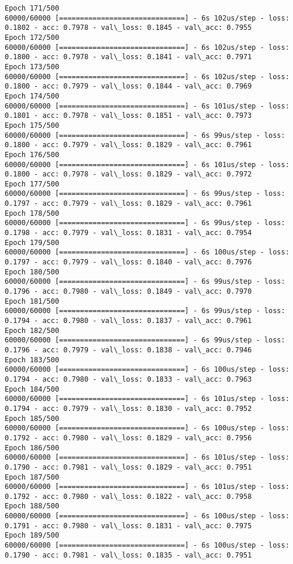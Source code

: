 \documentclass[11pt]{article}
\begin{document}
\begin{Verbatim}[commandchars=\\\{\}]
Epoch 171/500
60000/60000 [==============================] - 6s 102us/step - loss: 0.1802 - acc: 0.7978 - val\_loss: 0.1845 - val\_acc: 0.7955
Epoch 172/500
60000/60000 [==============================] - 6s 102us/step - loss: 0.1800 - acc: 0.7978 - val\_loss: 0.1841 - val\_acc: 0.7971
Epoch 173/500
60000/60000 [==============================] - 6s 102us/step - loss: 0.1800 - acc: 0.7979 - val\_loss: 0.1844 - val\_acc: 0.7969
Epoch 174/500
60000/60000 [==============================] - 6s 101us/step - loss: 0.1801 - acc: 0.7978 - val\_loss: 0.1851 - val\_acc: 0.7973
Epoch 175/500
60000/60000 [==============================] - 6s 99us/step - loss: 0.1800 - acc: 0.7979 - val\_loss: 0.1829 - val\_acc: 0.7961
Epoch 176/500
60000/60000 [==============================] - 6s 101us/step - loss: 0.1800 - acc: 0.7978 - val\_loss: 0.1829 - val\_acc: 0.7972
Epoch 177/500
60000/60000 [==============================] - 6s 99us/step - loss: 0.1797 - acc: 0.7979 - val\_loss: 0.1829 - val\_acc: 0.7961
Epoch 178/500
60000/60000 [==============================] - 6s 99us/step - loss: 0.1798 - acc: 0.7979 - val\_loss: 0.1831 - val\_acc: 0.7954
Epoch 179/500
60000/60000 [==============================] - 6s 100us/step - loss: 0.1797 - acc: 0.7979 - val\_loss: 0.1840 - val\_acc: 0.7976
Epoch 180/500
60000/60000 [==============================] - 6s 99us/step - loss: 0.1796 - acc: 0.7980 - val\_loss: 0.1849 - val\_acc: 0.7970
Epoch 181/500
60000/60000 [==============================] - 6s 99us/step - loss: 0.1794 - acc: 0.7980 - val\_loss: 0.1837 - val\_acc: 0.7961
Epoch 182/500
60000/60000 [==============================] - 6s 99us/step - loss: 0.1796 - acc: 0.7979 - val\_loss: 0.1838 - val\_acc: 0.7946
Epoch 183/500
60000/60000 [==============================] - 6s 100us/step - loss: 0.1794 - acc: 0.7980 - val\_loss: 0.1833 - val\_acc: 0.7963
Epoch 184/500
60000/60000 [==============================] - 6s 101us/step - loss: 0.1794 - acc: 0.7979 - val\_loss: 0.1830 - val\_acc: 0.7952
Epoch 185/500
60000/60000 [==============================] - 6s 100us/step - loss: 0.1792 - acc: 0.7980 - val\_loss: 0.1829 - val\_acc: 0.7956
Epoch 186/500
60000/60000 [==============================] - 6s 101us/step - loss: 0.1790 - acc: 0.7981 - val\_loss: 0.1829 - val\_acc: 0.7951
Epoch 187/500
60000/60000 [==============================] - 6s 101us/step - loss: 0.1792 - acc: 0.7980 - val\_loss: 0.1822 - val\_acc: 0.7958
Epoch 188/500
60000/60000 [==============================] - 6s 100us/step - loss: 0.1791 - acc: 0.7980 - val\_loss: 0.1831 - val\_acc: 0.7975
Epoch 189/500
60000/60000 [==============================] - 6s 100us/step - loss: 0.1790 - acc: 0.7981 - val\_loss: 0.1835 - val\_acc: 0.7951

\end{Verbatim}
\end{document}
